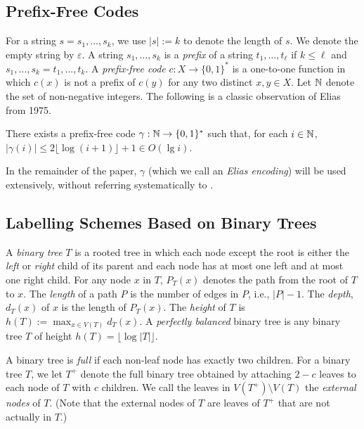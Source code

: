 \documentclass[kpfonts]{patmorin}
\let\le\leqslant
\begin{document}
\subsection{Prefix-Free Codes}

For a string $s=s_1,\ldots,s_k$, we use $|s|:=k$ to denote the length of $s$. 
We denote the empty string by $\varepsilon$. 
A string $s_1,\ldots,s_k$ is a \emph{prefix} of a string $t_1,\ldots,t_\ell$ if $k\le \ell$ and $s_1,\ldots,s_k=t_1,\ldots,t_k$.  A \emph{prefix-free code} $c:X\to\{0,1\}^*$ is a one-to-one function in which $c(x)$ is not a prefix of $c(y)$ for any two distinct $x,y\in X$.  Let $\mathbb{N}$ denote the set of non-negative integers.  The following is a classic observation of Elias from 1975.


\begin{lem}
    There exists a prefix-free code $\gamma:\mathbb{N}\to\{0,1\}^*$ such that, for each $i\in\mathbb{N}$, $|\gamma(i)|\le 2\lfloor\log(i+1)\rfloor + 1\in O(\lg i)$.
  \end{lem}

  In the remainder of the paper, $\gamma$ (which we call an \emph{Elias encoding}) will be used extensively, without referring systematically to .

\subsection{Labelling Schemes Based on Binary Trees}

A \emph{binary tree} $T$ is a rooted tree in which each node except the root is either the \emph{left} or \emph{right} child of its parent and each node has at most one left and at most one right child.  For any node $x$ in $T$, $P_T(x)$ denotes the path from the root of $T$ to $x$.  The \emph{length} of a path $P$ is the number of edges in $P$, i.e., $|P|-1$.  The \emph{depth}, $d_T(x)$ of $x$ is the length of $P_T(x)$.  The \emph{height} of $T$ is $h(T):=\max_{x\in V(T)} d_T(x)$.  A \emph{perfectly balanced} binary tree is any binary tree $T$ of height $h(T)=\lfloor\log|T|\rfloor$.

A binary tree is \emph{full} if each non-leaf node has exactly two children. For a binary tree $T$, we let $T^+$ denote the full binary tree obtained by attaching $2-c$ leaves to each node of $T$ with $c$ children.  We call the leaves in $V(T^+)\setminus V(T)$ the \emph{external nodes} of $T$.  (Note that the external nodes of $T$ are leaves of $T^+$ that are not actually in $T$.)
\end{document}
